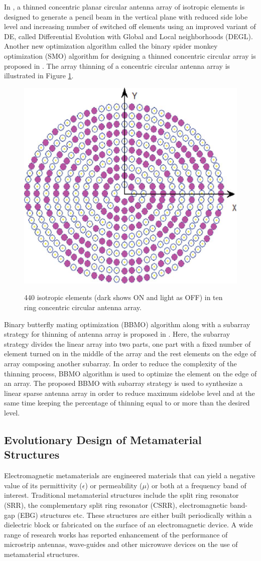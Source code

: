 In \cite{arrayThin1}, a thinned concentric planar circular antenna array of isotropic elements is designed to generate a pencil beam in the vertical plane with reduced side lobe level and increasing number of switched off elements using an improved variant of DE, called Differential Evolution with Global and Local neighborhoods (DEGL). Another new optimization algorithm called the binary spider monkey optimization (SMO) algorithm for designing a thinned concentric circular array is proposed in \cite{arrayThin2}. The array thinning of a concentric circular antenna array is illustrated in Figure \ref{fig_2_4}.

\begin{figure}
  \centering
  \includegraphics[width=0.35\linewidth]{fig_2_4.eps}\\
  \caption [Isotropic elements (dark shows ON and light as OFF) in ten ring concentric circular antenna array]{440 isotropic elements (dark shows ON and light as OFF) in ten ring concentric circular antenna array. \cite{arrayThin2}} \label{fig_2_4}
\end{figure}

Binary butterfly mating optimization (BBMO) algorithm along with a subarray strategy for thinning of antenna array is proposed in \cite{arrayThin3}. Here, the subarray strategy divides the linear array into two parts, one part with a fixed number of element turned on in the middle of the array and the rest elements on the edge of array composing another subarray. In order to reduce the complexity of the thinning process, BBMO algorithm is used to optimize the element on the edge of an array. The proposed BBMO with subarray strategy is used to synthesize a linear sparse antenna array in order to reduce maximum sidelobe level and at the same time keeping the percentage of thinning equal to or more than the desired level.

\subsection{Evolutionary Design of Metamaterial Structures}
Electromagnetic metamaterials are engineered materials that can yield a negative value of its permittivity ($\epsilon$) or permeability ($\mu$) or both at a frequency band of interest. Traditional metamaterial structures include the split ring resonator (SRR), the complementary split ring resonator (CSRR), electromagnetic band-gap (EBG) structures etc. These structures are either built periodically within a dielectric block or fabricated on the surface of an electromagnetic device. A wide range of research works has reported enhancement of the performance of microstrip antennas, wave-guides and other microwave devices on the use of metamaterial structures.

